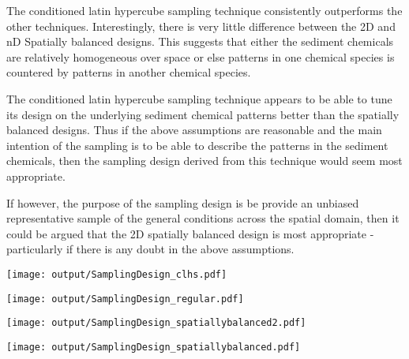 \documentclass[a4paper]{article}
\let\origfigure=\figure
\let\endorigfigure=\endfigure
\renewenvironment{figure}[1][]{%
   \origfigure[H]
}{%
   \endorigfigure
}
\begin{document}
The conditioned latin hypercube sampling technique consistently
outperforms the other techniques. Interestingly, there is very little
difference between the 2D and nD Spatially balanced designs. This
suggests that either the sediment chemicals are relatively homogeneous
over space or else patterns in one chemical species is countered by
patterns in another chemical species.

The conditioned latin hypercube sampling technique appears to be able to
tune its design on the underlying sediment chemical patterns better than
the spatially balanced designs. Thus if the above assumptions are
reasonable and the main intention of the sampling is to be able to
describe the patterns in the sediment chemicals, then the sampling
design derived from this technique would seem most appropriate.

If however, the purpose of the sampling design is be provide an unbiased
representative sample of the general conditions across the spatial
domain, then it could be argued that the 2D spatially balanced design is
most appropriate - particularly if there is any doubt in the above
assumptions.

\begin{figure}
\centering\scriptsize\scriptsize
\texttt{[image: output/SamplingDesign\_clhs.pdf]}
\caption{Sampling configurations associated with the lowest mean Error
for each sample size for cLHS for the East
Arm\label{fig:SamplingDesign_clhs}}
\end{figure}

\begin{figure}
\centering\scriptsize\scriptsize
\texttt{[image: output/SamplingDesign\_regular.pdf]}
\caption{Sampling configurations associated with the lowest mean Error
for each sample size for Regular grid sampling for the East
Arm\label{fig:SamplingDesign_regular}}
\end{figure}

\begin{figure}
\centering\scriptsize\scriptsize
\texttt{[image: output/SamplingDesign\_spatiallybalanced2.pdf]}
\caption{Sampling configurations associated with the lowest mean Error
for each sample size for nD Spatially balanced sampling for the East
Arm\label{fig:SamplingDesignspatiallybalanced2}}
\end{figure}

\begin{figure}
\centering\scriptsize\scriptsize
\texttt{[image: output/SamplingDesign\_spatiallybalanced.pdf]}
\caption{Sampling configurations associated with the lowest mean Error
for each sample size for 2D Spatially balanced sampling for the East
Arm\label{fig:SamplingDesignspatiallybalanced}}
\end{figure}
\end{document}
